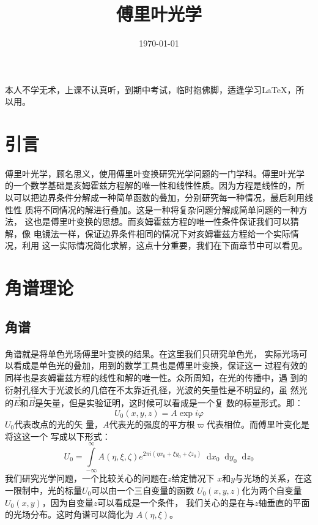 \documentclass{article}
\title{傅里叶光学}
\date{\today}
\newcommand*{\dif}{\mathop{}\!\mathrm{d}}
\begin{document}
\maketitle
\tableofcontents
本人不学无术，上课不认真听，到期中考试，临时抱佛脚，适逢学习\LaTeX，所
以用。
\section{引言}
\paragraph{}
傅里叶光学，顾名思义，使用傅里叶变换研究光学问题的一门学科。傅里叶光学
的一个数学基础是亥姆霍兹方程解的唯一性和线性性质。因为方程是线性的，所
以可以把边界条件分解成一种简单函数的叠加，分别研究每一种情况，最后利用线性性
质将不同情况的解进行叠加。这是一种将复杂问题分解成简单问题的一种方法，
这也是傅里叶变换的思想。而亥姆霍兹方程的唯一性条件保证我们可以猜解，像
电镜法一样，保证边界条件相同的情况下对亥姆霍兹方程给一个实际情况，利用
这一实际情况简化求解，这点十分重要，我们在下面章节中可以看见。
\section{角谱理论}
\subsection{角谱}
\paragraph{}
角谱就是将单色光场傅里叶变换的结果。在这里我们只研究单色光，
实际光场可以看成是单色光的叠加，用到的数学工具也是傅里叶变换，保证这一
过程有效的同样也是亥姆霍兹方程的线性和解的唯一性。众所周知，在光的传播中，遇
到的衍射孔径大于光波长的几倍在不太靠近孔径，光波的矢量性是不明显的，虽
然光的$\vec{E}$和$\vec{B}$是矢量，但是实验证明，这时候可以看成是一个复
数的标量形式。即：\[U_0(x,y,z)=A\exp{i\varphi}\] $U_0$代表改点的光的矢
量，$A$代表光的强度的平方根$\varpi$代表相位。而傅里叶变化是将这这一个
写成以下形式：
\[U_0=\int\limits_{-\infty}^{\infty}A(\eta,\xi,\zeta)e^{2\pi i(\eta
    x_0+\xi y_0+\zeta z_0)}\dif x_0 \dif
  y_0 \dif z_0\]我们研究光学问题，一个比较关心的问题在$z$给定情况下
$x$和$y$与光场的关系，在这一限制中，光的标量$U_0$可以由一个三自变量的函数
$U_0(x,y,z)$化为两个自变量$U_0(x,y)$，因为自变量$z$可以看成是一个条件，
我们关心的是在与$z$轴垂直的平面的光场分布。这时角谱可以简化为
$A(\eta,\xi)$。
\end{document}
